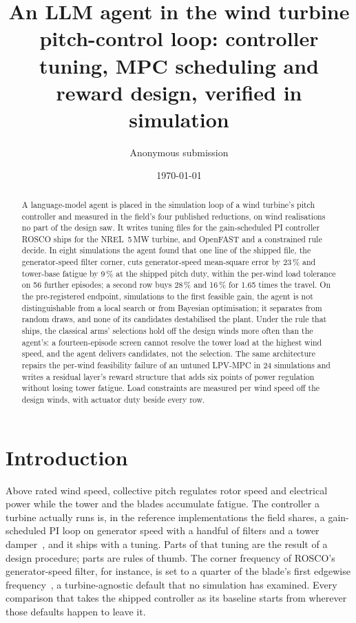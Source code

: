 \documentclass{article}
\title{An LLM agent in the wind turbine pitch-control loop: controller tuning, MPC scheduling and reward design, verified in simulation}
\author{Anonymous submission}%
\date{\today}
\begin{document}
\maketitle

\begin{abstract}
A language-model agent is placed in the simulation loop of a wind turbine's pitch controller and measured in the field's four published reductions, on wind realisations no part of the design saw. It writes tuning files for the gain-scheduled PI controller ROSCO ships for the NREL~5\,MW turbine, and OpenFAST and a constrained rule decide. In eight simulations the agent found that one line of the shipped file, the generator-speed filter corner, cuts generator-speed mean-square error by 23\,\% and tower-base fatigue by 9\,\% at the shipped pitch duty, within the per-wind load tolerance on 56 further episodes; a second row buys 28\,\% and 16\,\% for 1.65 times the travel. On the pre-registered endpoint, simulations to the first feasible gain, the agent is not distinguishable from a local search or from Bayesian optimisation; it separates from random draws, and none of its candidates destabilised the plant. Under the rule that ships, the classical arms' selections hold off the design winds more often than the agent's: a fourteen-episode screen cannot resolve the tower load at the highest wind speed, and the agent delivers candidates, not the selection. The same architecture repairs the per-wind feasibility failure of an untuned LPV-MPC in 24 simulations and writes a residual layer's reward structure that adds six points of power regulation without losing tower fatigue. Load constraints are measured per wind speed off the design winds, with actuator duty beside every row.
\end{abstract}

\section{Introduction}
\label{sec:intro}

Above rated wind speed, collective pitch regulates rotor speed and electrical power while the tower and the blades accumulate fatigue. The controller a turbine actually runs is, in the reference implementations the field shares, a gain-scheduled PI loop on generator speed with a handful of filters and a tower damper~\citep{Bossanyi2000,Abbas2022rosco}, and it ships with a tuning. Parts of that tuning are the result of a design procedure; parts are rules of thumb. The corner frequency of ROSCO's generator-speed filter, for instance, is set to a quarter of the blade's first edgewise frequency~\citep{Abbas2022rosco}, a turbine-agnostic default that no simulation has examined. Every comparison that takes the shipped controller as its baseline starts from wherever those defaults happen to leave it.
\end{document}
